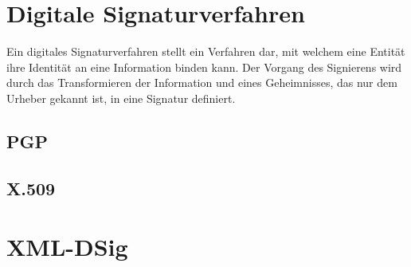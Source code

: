 \section{Digitale Signaturverfahren}
\label{sec:GrundlagenDefinitionen:DigitaleSignaturen:Verfahren}
Ein digitales Signaturverfahren stellt ein Verfahren dar, mit welchem eine Entität ihre Identität an eine Information binden kann. Der Vorgang des Signierens
wird durch das Transformieren der Information und eines Geheimnisses, das nur dem Urheber gekannt ist, in eine Signatur definiert\cite{hac}.

\subsection{PGP}
\label{sec:GrundlagenDefinitionen:DigitaleSignaturen:Verfahren:pgp}

\subsection{X.509}
\label{sec:GrundlagenDefinitionen:DigitaleSignaturen:Verfahren:x509}

\section{XML-DSig}
\label{sec:GrundlagenDefinitionen:xml-dsig}
